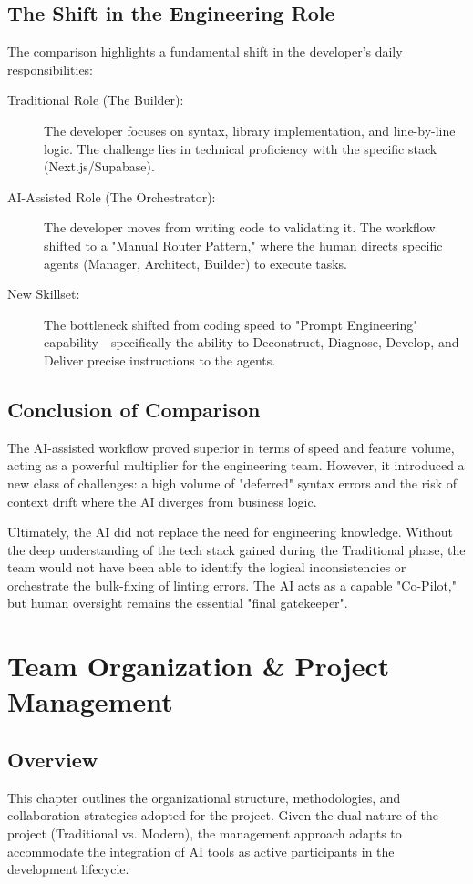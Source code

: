 \documentclass[a4paper,12pt]{report}
\begin{document}
\section{The Shift in the Engineering Role}
The comparison highlights a fundamental shift in the developer's daily responsibilities:

\begin{description}
    \item[Traditional Role (The Builder):] The developer focuses on syntax, library implementation, and line-by-line logic. The challenge lies in technical proficiency with the specific stack (Next.js/Supabase).
    \item[AI-Assisted Role (The Orchestrator):] The developer moves from writing code to validating it. The workflow shifted to a "Manual Router Pattern," where the human directs specific agents (Manager, Architect, Builder) to execute tasks.
    \item[New Skillset:] The bottleneck shifted from coding speed to "Prompt Engineering" capability—specifically the ability to Deconstruct, Diagnose, Develop, and Deliver precise instructions to the agents.
\end{description}

\section{Conclusion of Comparison}
The AI-assisted workflow proved superior in terms of speed and feature volume, acting as a powerful multiplier for the engineering team. However, it introduced a new class of challenges: a high volume of "deferred" syntax errors and the risk of context drift where the AI diverges from business logic.

Ultimately, the AI did not replace the need for engineering knowledge. Without the deep understanding of the tech stack gained during the Traditional phase, the team would not have been able to identify the logical inconsistencies or orchestrate the bulk-fixing of linting errors. The AI acts as a capable "Co-Pilot," but human oversight remains the essential "final gatekeeper".

\chapter{Team Organization \& Project Management}

\section{Overview}
This chapter outlines the organizational structure, methodologies, and collaboration strategies adopted for the project. Given the dual nature of the project (Traditional vs. Modern), the management approach adapts to accommodate the integration of AI tools as active participants in the development lifecycle.
\end{document}

